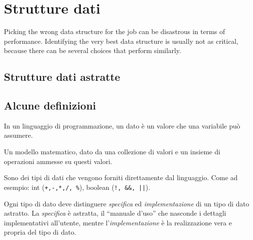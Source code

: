 
\ifsubfile
\usepackage[newfloat, cachedir=_minted-cache, outputdir=../build]{minted}
\usepackage{../libraries/set-minted}

\pagestyle{plain}
\setcounter{chapter}{3}


\fi
\chapter{Strutture dati}
\begin{fquote}
	Picking the wrong data structure for the job can be disastrous in terms of performance.
	Identifying the very best data structure is usually not as critical, because there can be several choices that perform similarly.
\end{fquote}

\section{Strutture dati astratte}

\section*{Alcune definizioni}

\begin{definition}
In un linguaggio di programmazione, un dato è un valore che una variabile può assumere.
\end{definition}

\begin{definition}
Un modello matematico, dato da una collezione di valori e un insieme di operazioni ammesse su questi valori.
\end{definition}

\begin{definition}
Sono dei tipi di dati che vengono forniti direttamente dal linguaggio.
Come ad esempio: int (\texttt{+,-,*,/, \%}), boolean (\texttt{!, \&\&, ||}).
\end{definition}

Ogni tipo di dato deve distinguere \emph{specifica} ed \emph{implementazione} di un tipo di dato astratto.
La \emph{specifica} è astratta, il \enquote{manuale d'uso} che nasconde i dettagli implementativi all'utente, mentre l'\emph{implementazione} è la realizzazione vera e propria del tipo di dato.


